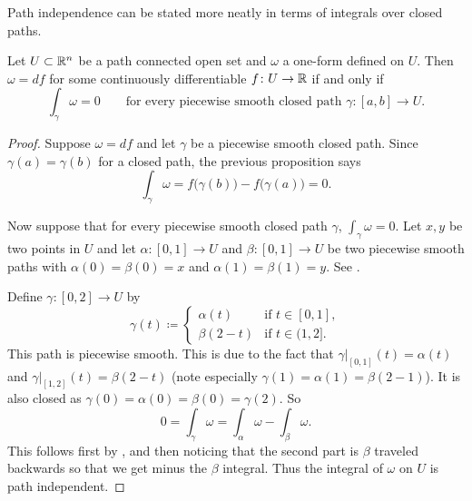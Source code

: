 Path independence can be stated more neatly in terms of integrals over
closed paths.

\begin{prop}
Let $U \subset {\mathbb{R}}^n$ be a path connected open set and $\omega$
a one-form defined on $U$.
Then $\omega = df$ for some continuously differentiable $f \colon U \to
{\mathbb{R}}$ if and only if
\begin{equation*}
\int_{\gamma} \omega = 0
\qquad
\text{for every piecewise smooth closed path } \gamma \colon [a,b] \to U.
\end{equation*}
\end{prop}

\begin{proof}
Suppose $\omega = df$ and let $\gamma$ be a piecewise smooth
closed path.  
Since $\gamma(a) = \gamma(b)$ for a closed path,
the previous proposition says
\begin{equation*}
\int_{\gamma} \omega = f\bigl(\gamma(b)\bigr) - f\bigl(\gamma(a)\bigr) = 0 .
\end{equation*}

Now suppose that for every piecewise smooth closed path $\gamma$, $\int_{\gamma} \omega = 0$.
Let $x,y$ be two points in $U$ and let $\alpha \colon [0,1] \to U$ and
$\beta \colon [0,1] \to U$ be two piecewise smooth paths with $\alpha(0) = \beta(0) = x$
and $\alpha(1) = \beta(1) = y$.  See .
\begin{myfigureht}
\caption{Two paths from $x$ to $y$.\label{fig:twopaths}}
\end{myfigureht}

Define $\gamma \colon [0,2] \to U$ by
\begin{equation*}
\gamma(t) \coloneqq
\begin{cases}
\alpha(t)  & \text{if } t \in [0,1], \\
\beta(2-t) & \text{if } t \in (1,2].
\end{cases}
\end{equation*}
This path is piecewise smooth.  This is due to the fact that
$\gamma|_{[0,1]}(t) = \alpha(t)$ and
$\gamma|_{[1,2]}(t) = \beta(2-t)$ (note especially $\gamma(1) = \alpha(1) =
\beta(2-1)$).
It is also closed as $\gamma(0) = \alpha(0) = \beta(0) = \gamma(2)$.
So 
\begin{equation*}
0 = \int_{\gamma} \omega = \int_{\alpha} \omega - \int_{\beta} \omega .
\end{equation*}
This follows first by , and then noticing that
the second part is $\beta$ traveled backwards so that we get minus the
$\beta$ integral.  Thus the integral of $\omega$ on $U$ is path independent.
\end{proof}

